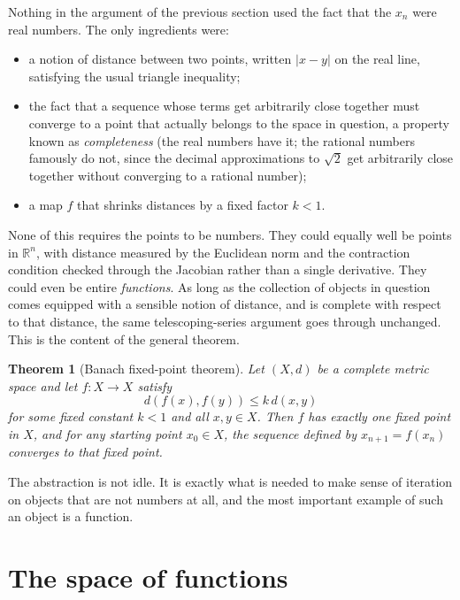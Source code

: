 \documentclass{essay}
\newtheorem*{theorem*}{Theorem}
\begin{document}
Nothing in the argument of the previous section used the fact that
the \(x_{n}\) were real numbers. The only ingredients were:
\begin{itemize}
  \item a notion of distance between two points, written \(|x - y|\)
    on the real line, satisfying the usual triangle inequality;
  \item the fact that a sequence whose terms get arbitrarily close
    together must converge to a point that actually belongs to the
    space in question, a property known as \emph{completeness} (the
      real numbers have it; the rational numbers famously do not,
      since the decimal approximations to \(\sqrt{2}\) get arbitrarily
    close together without converging to a rational number);
  \item a map \(f\) that shrinks distances by a fixed factor \(k < 1\).
\end{itemize}
None of this requires the points to be numbers. They could equally
well be points in \(\mathbb{R}^{n}\), with distance measured by the
Euclidean norm and the contraction condition checked through the
Jacobian rather than a single derivative. They could even be entire
\emph{functions}. As long as the collection of objects in question
comes equipped with a sensible notion of distance, and is complete
with respect to that distance, the same telescoping-series argument
goes through unchanged. This is the content of the general theorem.

\begin{theorem*}[Banach fixed-point theorem]
  Let \((X, d)\) be a complete metric space and let \(f : X \to X\) satisfy
  \[ d(f(x), f(y)) \le k\, d(x, y) \]
  for some fixed constant \(k < 1\) and all \(x, y \in X\). Then \(f\) has
  exactly one fixed point in \(X\), and for any starting point
  \(x_{0} \in X\), the sequence defined by \(x_{n+1} = f(x_{n})\) converges to
  that fixed point.
\end{theorem*}

The abstraction is not idle. It is exactly what is needed to make
sense of iteration on objects that are not numbers at all, and the
most important example of such an object is a function.

\section{The space of functions}
\end{document}
